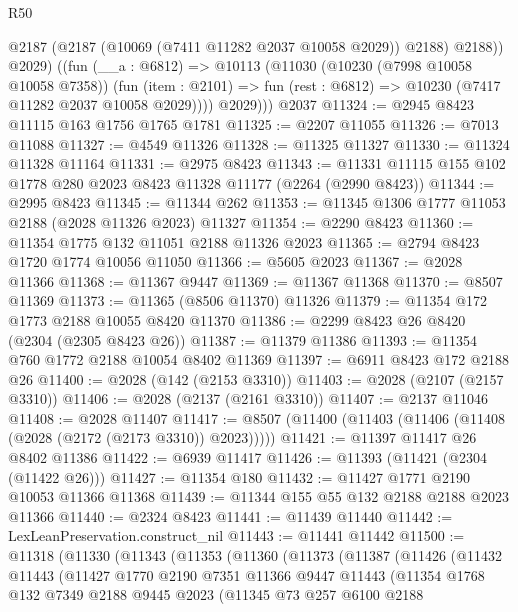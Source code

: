 \begin{lexlean}{R50}
\begin{coremodule}
          @2187 (@2187 (@10069 (@7411 @11282 @2037 @10058 @2029)) @2188) @2188))
          @2029)
        ((fun (__a : @6812) =>
        @10113
          (@11030
            (@10230 (@7998 @10058 @10058 @7358))
            (fun (item : @2101) => fun (rest : @6812) => @10230 (@7417 @11282 @2037 @10058 @2029))))
          @2029)))
    @2037
@11324 := @2945 @8423 @11115 @163 @1756 @1765 @1781
@11325 := @2207 @11055
@11326 := @7013 @11088
@11327 := @4549 @11326
@11328 := @11325 @11327
@11330 := @11324 @11328 @11164
@11331 := @2975 @8423
@11343 := @11331 @11115 @155 @102 @1778 @280 @2023 @8423 @11328 @11177 (@2264 (@2990 @8423))
@11344 := @2995 @8423
@11345 := @11344 @262
@11353 := @11345 @1306 @1777 @11053 @2188 (@2028 @11326 @2023) @11327
@11354 := @2290 @8423
@11360 := @11354 @1775 @132 @11051 @2188 @11326 @2023
@11365 := @2794 @8423 @1720 @1774 @10056 @11050
@11366 := @5605 @2023
@11367 := @2028 @11366
@11368 := @11367 @9447
@11369 := @11367 @11368
@11370 := @8507 @11369
@11373 := @11365 (@8506 @11370) @11326
@11379 := @11354 @172 @1773 @2188 @10055 @8420 @11370
@11386 := @2299 @8423 @26 @8420 (@2304 (@2305 @8423 @26))
@11387 := @11379 @11386
@11393 := @11354 @760 @1772 @2188 @10054 @8402 @11369
@11397 := @6911 @8423 @172 @2188 @26
@11400 := @2028 (@142 (@2153 @3310))
@11403 := @2028 (@2107 (@2157 @3310))
@11406 := @2028 (@2137 (@2161 @3310))
@11407 := @2137 @11046
@11408 := @2028 @11407
@11417 := @8507 (@11400 (@11403 (@11406 (@11408 (@2028 (@2172 (@2173 @3310)) @2023)))))
@11421 := @11397 @11417 @26 @8402 @11386
@11422 := @6939 @11417
@11426 := @11393 (@11421 (@2304 (@11422 @26)))
@11427 := @11354 @180
@11432 := @11427 @1771 @2190 @10053 @11366 @11368
@11439 := @11344 @155 @55 @132 @2188 @2188 @2023 @11366
@11440 := @2324 @8423
@11441 := @11439 @11440
@11442 := LexLeanPreservation.construct_nil
@11443 := @11441 @11442
@11500 := @11318
    (@11330
      (@11343
        (@11353
          (@11360
            (@11373
              (@11387
                (@11426
                  (@11432
                    @11443
                    (@11427
                      @1770
                      @2190
                      @7351
                      @11366
                      @9447
                      @11443
                      (@11354
                        @1768
                        @132
                        @7349
                        @2188
                        @9445
                        @2023
                        (@11345
                          @73
                          @257
                          @6100
                          @2188

\end{coremodule}
\end{lexlean}
